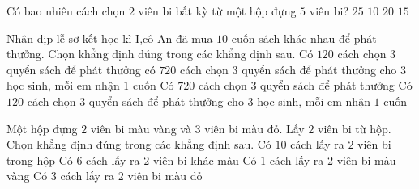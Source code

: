 \begin{ex}%
	Có bao nhiêu cách  chọn $2$ viên bi bất kỳ từ một hộp đựng $5$ viên bi?
	 \choice
		{$25$} 
		{\True  $10$}
		 {$20$}
		{$15$} 
\end{ex}


\begin{ex}%
	Nhân dịp lễ sơ kết học kì I,cô An đã mua $10$ cuốn sách khác nhau để phát thưởng. Chọn khẳng định đúng trong các khẳng định  sau.
	\choiceTF 
		{\True Có $120$ cách chọn $3$ quyển sách để  phát thưởng}
		{\True có $720$ cách chọn $3$ quyển sách để phát thưởng cho $3$ học sinh, mỗi em nhận $1$ cuốn } 
		{Có $720$ cách chọn $3$ quyển sách để phát thưởng} 
		{Có $120$ cách chọn $3$ quyển sách để phát thưởng cho  $3$ học sinh, mỗi em nhận $1$ cuốn }
\end{ex}

\begin{ex}%
	Một hộp đựng $2$ viên bi màu vàng và $3$ viên bi màu đỏ. Lấy $2$ viên bi từ hộp. Chọn khẳng định đúng trong các khẳng  định sau.
	\choiceTF 
		{\True  Có $10$ cách lấy ra $2$ viên bi trong hộp}
		{\True Có $6$ cách lấy ra $2$  viên bi khác màu}
		{\True Có $1$ cách lấy ra $2$ viên  bi màu vàng}
		{\True  Có $3$ cách lấy ra $2$ viên bi màu đỏ}
\end{ex}

